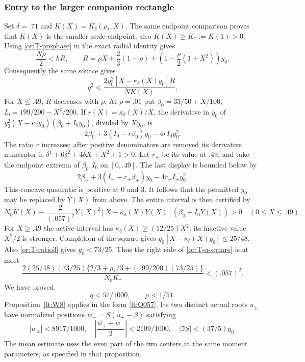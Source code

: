 \subsubsection{Entry to the larger companion rectangle}

Set $\delta=.71$ and $K(X)=K_\delta(\rho_*,X)$.
The same endpoint comparison proves that $K(X)$ is the smaller
scale endpoint; also $K(X)\ge K_*:=K(1)>0$.
Using \eqref{or:T-prephase} in the exact radial identity gives
\[
 \frac{N\rho}{2}<hR,\qquad
 R=\rho X+\frac23(1-\rho)
                   +\left(1-\frac\rho2(1+X^2)\right)y_0.
\]
Consequently the same source gives
\begin{equation}\label{or:T-q-square}
 q^2<\frac{2y_0^2[X-\kappa_\delta(X)y_0]R}{NK(X)}.
\end{equation}
For $X\le.49$, $R$ decreases with $\rho$.  At $\rho=.01$ put
$\beta_0=33/50+X/100$, $I_0=199/200-X^2/200$.
If $r(X)=\kappa_\delta(X)/X$, the derivative in $y_0$ of
$y_0^2(X-\kappa_\delta y_0)(\beta_0+I_0y_0)$, divided by $Xy_0$,
is
\[
       2\beta_0+3(I_0-r\beta_0)y_0-4rI_0y_0^2.
\]
The ratio $r$ increases: after positive denominators are removed
its derivative numerator is
$\delta^4+6\delta^2+4\delta X+X^2+1>0$.
Let $r_+$ be its value at $.49$, and take the endpoint extrema of
$\beta_0,I_0$ on $[0,.49]$.  The last display is bounded below by
\[
 2\beta_-+3(I_--r_+\beta_+)y_0-4r_+I_+y_0^2.
\]
This concave quadratic is positive at $0$ and $3$.  It follows that
the permitted $y_0$ may be replaced by $Y(X)$ from above.  The entire
interval is then certified by
\begin{equation}\label{or:T-q-low-poly}
 N_0K(X)-\frac{2}{(.057)^2}Y(X)^2
       [X-\kappa_\delta(X)Y(X)](\beta_0+I_0Y(X))>0
                   \quad(0\le X\le.49).
\end{equation}
For $X\ge.49$ the active interval has
$\kappa_\delta(X)\ge(12/25)X^2$; its inactive value $X^2/2$ is
stronger.  Completion of the square gives
$y_0[X-\kappa_\delta(X)y_0]\le25/48$.
Also \eqref{or:T-ratio3} gives $y_0<73/25$.
Thus the right side of \eqref{or:T-q-square} is at most
\[
 \frac{2(25/48)(73/25)
       \{2/3+\rho_*/3+(199/200)(73/25)\}}{N_0K_*}<(.057)^2.
\]
We have proved
\begin{equation}\label{or:T-Q057-entry}
                            q<57/1000,\qquad \mu<1/51.
\end{equation}
Proposition~\ref{lt:W8} applies in the form \eqref{lt:Q057}.
Its two distinct actual roots
$u_\pm$ have normalized positions $w_\pm=S(u_\pm-\beta)$ satisfying
\begin{equation}\label{or:T-Q057-pair}
 |w_\pm|<8917/1000,\quad
 \left|\frac{w_++w_-}{2}\right|<2109/1000,\quad
                         |\Im S|<(37/5)y_0.
\end{equation}
The mean estimate uses the even part of the two centers at the same
moment parameters, as specified in that proposition.

